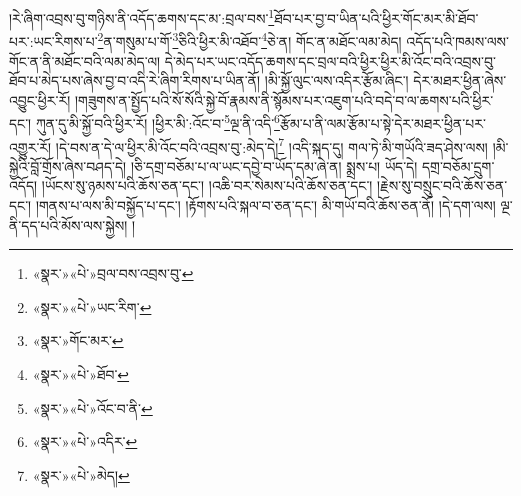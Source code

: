 །རེ་ཞིག་འབྲས་བུ་གཉིས་ནི་འདོད་ཆགས་དང་མ་:བྲལ་བས་\footnote{«སྣར་»«པེ་»བྲལ་བས་འབྲས་བུ་}ཐོབ་པར་བྱ་བ་ཡིན་པའི་ཕྱིར་གོང་མར་མི་ཐོབ་པར་:ཡང་རིགས་པ་\footnote{«སྣར་»«པེ་»ཡང་རིག་}ན་གསུམ་པ་གོ་\footnote{«སྣར་»གོང་མར་}ཅིའི་ཕྱིར་མི་འཐོབ་\footnote{«སྣར་»«པེ་»ཐོབ་}ཅེ་ན། གོང་ན་མཐོང་ལམ་མེད། འདོད་པའི་ཁམས་ལས་གོང་ན་ནི་མཐོང་བའི་ལམ་མེད་ལ། དེ་མེད་པར་ཡང་འདོད་ཆགས་དང་བྲལ་བའི་ཕྱིར་ཕྱིར་མི་འོང་བའི་འབྲས་བུ་ཐོབ་པ་མེད་པས་ཞེས་བྱ་བ་འདི་རེ་ཞིག་རིགས་པ་ཡིན་ནོ། །མི་སྐྱོ་ལུང་ལས་འདིར་རྩོམ་ཞིང་། དེར་མཐར་ཕྱིན་ཞེས་འབྱུང་ཕྱིར་རོ། །གཟུགས་ན་སྤྱོད་པའི་སོ་སོའི་སྐྱེ་བོ་རྣམས་ནི་སྙོམས་པར་འཇུག་པའི་བདེ་བ་ལ་ཆགས་པའི་ཕྱིར་དང་། ཀུན་དུ་མི་སྐྱོ་བའི་ཕྱིར་རོ། །ཕྱིར་མི་:འོང་བ་\footnote{«སྣར་»«པེ་»འོང་བ་ནི་}ལྔ་ནི་འདི་\footnote{«སྣར་»«པེ་»འདིར་}རྩོམ་པ་ནི་ལམ་རྩོམ་པ་སྟེ་དེར་མཐར་ཕྱིན་པར་འགྱུར་རོ། །དེ་བས་ན་དེ་ལ་ཕྱིར་མི་འོང་བའི་འབྲས་བུ་:མེད་དེ།\footnote{«སྣར་»«པེ་»མེད།} །འདི་སྐད་དུ། གལ་ཏེ་མི་གཡོའི་ཟད་ཤེས་ལས། །མི་སྐྱེའི་བློ་གྲོས་ཞེས་བཤད་དེ། །ཅི་དགྲ་བཅོམ་པ་ལ་ཡང་དབྱེ་བ་ཡོད་དམ་ཞེ་ན། སྨྲས་པ། ཡོད་དེ། དགྲ་བཅོམ་དྲུག་འདོད། །ཡོངས་སུ་ཉམས་པའི་ཆོས་ཅན་དང་། །འཆི་བར་སེམས་པའི་ཆོས་ཅན་དང་། །རྗེས་སུ་བསྲུང་བའི་ཆོས་ཅན་དང་། །གནས་པ་ལས་མི་བསྐྱོད་པ་དང་། །རྟོགས་པའི་སྐལ་བ་ཅན་དང་། མི་གཡོ་བའི་ཆོས་ཅན་ནོ། །དེ་དག་ལས། ལྔ་ནི་དད་པའི་མོས་ལས་སྐྱེས། །
